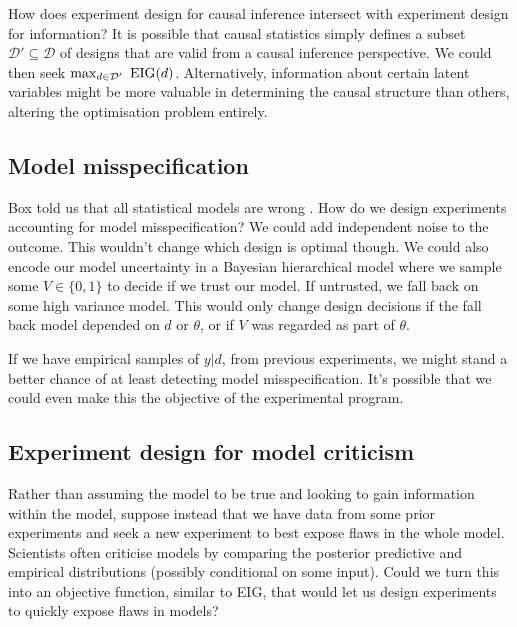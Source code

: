 How does experiment design for causal inference intersect with experiment design for information? It is possible that causal statistics simply defines a subset $\mathcal{D}' \subseteq \mathcal{D}$ of designs that are valid from a causal inference perspective. We could then seek $\max_{d\in\mathcal{D}'}\ \eig(d)$. Alternatively, information about certain latent variables might be more valuable in determining the causal structure than others, altering the optimisation problem entirely.


\subsection{Model misspecification}
Box told us that all statistical models are wrong \cite{box1976}. How do we design experiments accounting for model misspecification? We could add independent noise to the outcome. This wouldn't change which design is optimal though. We could also encode our model uncertainty in a Bayesian hierarchical model where we sample some $V \in \{0, 1\}$ to decide if we trust our model. If untrusted, we fall back on some high variance model. This would only change design decisions if the fall back model depended on $d$ or $\theta$, or if $V$ was regarded as part of $\theta$.

If we have empirical samples of $y|d$, from previous experiments, we might stand a better chance of at least detecting model misspecification. It's possible that we could even make this the objective of the experimental program.

\subsection{Experiment design for model criticism}
Rather than assuming the model to be true and looking to gain information within the model, suppose instead that we have data from some prior experiments and seek a new experiment to best expose flaws in the whole model. Scientists often criticise models by comparing the posterior predictive and empirical distributions (possibly conditional on some input). Could we turn this into an objective function, similar to EIG, that would let us design experiments to quickly expose flaws in models?


